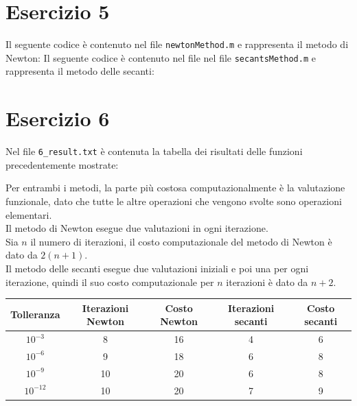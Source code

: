 \documentclass[10pt,a4paper]{article}
\begin{document}
\section*{Esercizio 5}
Il seguente codice è contenuto nel file \texttt{newtonMethod.m} e rappresenta il metodo di Newton:
\clearpage
Il seguente codice è contenuto nel file nel file \texttt{secantsMethod.m} e rappresenta il metodo delle secanti:\\


\section*{Esercizio 6}
Nel file \texttt{6\_result.txt} è contenuta la tabella dei risultati delle funzioni precedentemente mostrate:

Per entrambi i metodi, la parte più costosa computazionalmente è la valutazione funzionale, dato che tutte le altre operazioni che vengono svolte sono operazioni elementari.\\
Il metodo di Newton esegue due valutazioni in ogni iterazione.\\
Sia $n$ il numero di iterazioni, il costo computazionale del metodo di Newton è dato da $2(n+1)$.\\
Il metodo delle secanti esegue due valutazioni iniziali e poi una per ogni iterazione, quindi il suo costo computazionale per $n$ iterazioni è dato da $n+2$.
\begin{center}
\begin{tabular}{|c c c c c|} 
 \hline
 Tolleranza & Iterazioni Newton & Costo Newton & Iterazioni secanti & Costo secanti\\ [0.5ex] 
 \hline
 $10^{-3}$ & 8 & 16 & 4 & 6 \\ 
 \hline
 $10^{-6}$ & 9 & 18 & 6 & 8 \\
 \hline
 $10^{-9}$ & 10 & 20 & 6 & 8 \\
 \hline
 $10^{-12}$ & 10 & 20 & 7 & 9 \\
 \hline
\end{tabular}
\end{center}
\pagebreak
\end{document}
